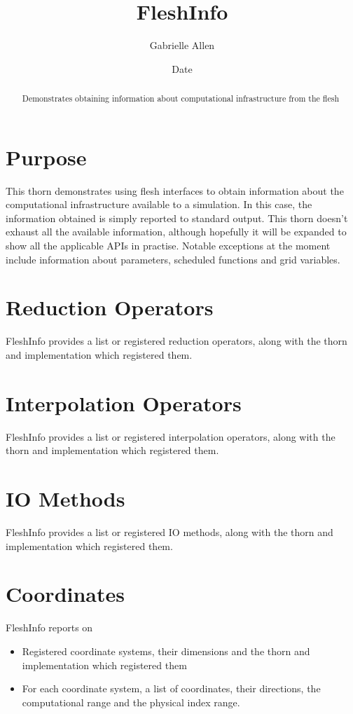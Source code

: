 \documentclass{article}
\begin{document}
\title{FleshInfo}
\author{Gabrielle Allen}
\date{$ $Date$ $}

\maketitle


\begin{abstract}
Demonstrates obtaining information about computational infrastructure
from the flesh
\end{abstract}

\section{Purpose}

This thorn demonstrates using flesh interfaces to obtain information
about the computational infrastructure available to a simulation. 
In this case, the information obtained is simply reported to standard
output. This thorn doesn't exhaust all the available information, although
hopefully it will be expanded to show all the applicable APIs in practise.
Notable exceptions at the moment include information about parameters, 
scheduled functions and grid variables.

\section{Reduction Operators}

FleshInfo provides a list or registered reduction operators, along 
with the thorn and implementation which registered them.

\section{Interpolation Operators}

FleshInfo provides a list or registered interpolation operators, along 
with the thorn and implementation which registered them.

\section{IO Methods}

FleshInfo provides a list or registered IO methods, along 
with the thorn and implementation which registered them.

\section{Coordinates}
FleshInfo reports on
\begin{itemize}
\item Registered coordinate systems, their dimensions and the thorn
	and implementation which registered them
\item For each coordinate system, a list of coordinates, their
	directions, the computational range and the physical index range.
\end{itemize}
\end{document}
